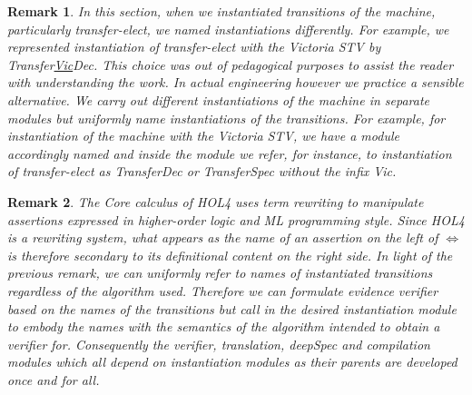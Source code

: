 \documentclass[10pt,conference]{IEEEtran}
\newtheorem{remark}{Remark}
\begin{document}
\begin{remark}\label{naming}
In this section, when we instantiated transitions of the machine, particularly transfer-elect, we named instantiations differently. For example, we represented instantiation of transfer-elect with the Victoria STV by  Transfer\underline{Vic}Dec. This choice was out of pedagogical purposes to assist the reader with understanding the work. In actual engineering however we practice a sensible alternative. We carry out different instantiations of the machine in separate modules but uniformly name instantiations of the transitions. For example, for instantiation of the machine with the Victoria STV, we have a module accordingly named and inside the module we refer, for instance, to instantiation of transfer-elect as TransferDec or TransferSpec without the infix Vic.
\end{remark}
\begin{remark}\label{rewrting}
The Core calculus of HOL4 uses \emph{term rewriting} to manipulate assertions expressed in higher-order logic and ML programming style.   
Since HOL4 is a rewriting system, what appears as the name of an assertion on the left of $\Leftrightarrow$ is therefore secondary to its definitional content on the right side. In light of the previous remark, we can uniformly refer to \emph{names} of instantiated transitions regardless of the algorithm used. Therefore we can formulate evidence verifier based on the names of the transitions but call in the desired instantiation  module to embody the names with the semantics  of the algorithm intended to obtain a verifier for. Consequently the verifier, translation, deepSpec and compilation modules which all depend on instantiation modules as their parents  are    developed once and for all.   
\end{remark}

 
\end{document}
